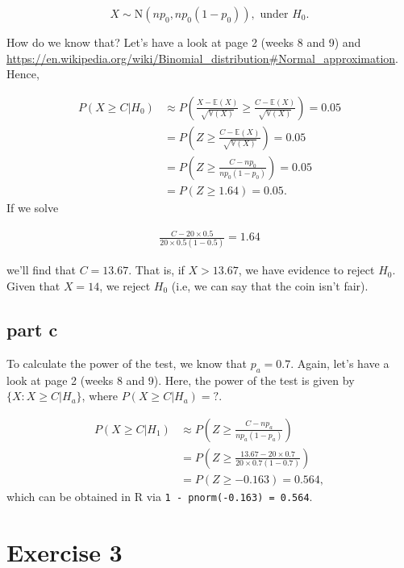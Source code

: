 \documentclass[12pt]{article}
\begin{document}
\begin{equation}
    X \sim \mbox{N}\left(np_{0}, np_{0}(1-p_{0}) \right), \mbox{ under } H_{0}.
\end{equation}

How do we know that? Let's have a look at page 2 (weeks 8 and 9) and \url{https://en.wikipedia.org/wiki/Binomial_distribution#Normal_approximation}. Hence,

\begin{align}
    P(X \geq C| H_{0}) & \approx P\left(\frac{X - \mathbb{E}(X)}{\sqrt{\mathbb{V}(X)}} \geq \frac{C - \mathbb{E}(X)}{\sqrt{\mathbb{V}(X)}}\right) = 0.05 \\
    & = P\left(Z \geq \frac{C - \mathbb{E}(X)}{\sqrt{\mathbb{V}(X)}}\right) = 0.05 \\
    & = P\left(Z \geq \frac{C - np_{0}}{np_{0}(1-p_{0})}\right) = 0.05 \\
    & = P\left( Z \geq 1.64 \right) = 0.05.
\end{align}
If we solve

\begin{align}
\frac{C - 20 \times 0.5}{20 \times 0.5(1-0.5)} = 1.64
\end{align}

we'll find that $C = 13.67$. That is, if $X > 13.67$, we have evidence to reject $H_{0}$. Given that $X = 14$, we reject $H_{0}$ (i.e, we can say that the coin isn't fair).


\subsection*{part c}


To calculate the power of the test, we know that $p_{a} = 0.7$. Again, let's have a look at page 2 (weeks 8 and 9). Here, the power of the test is given by $\{ X: X \geq C | H_{a}\}$, where $P(X \geq C| H_{a}) = ?$.

\begin{align}
    P(X \geq C| H_{1}) & \approx P\left( Z \geq \frac{C - np_{a}}{np_{a}(1-p_{a})} \right) \\
    & = P\left( Z \geq \frac{13.67 - 20 \times 0.7}{20 \times 0.7(1-0.7)} \right) \\
    & = P(Z \geq -0.163) = 0.564,
\end{align}
which can be obtained in R via \texttt{1 - pnorm(-0.163) = 0.564}.


\section*{Exercise 3}
\end{document}
